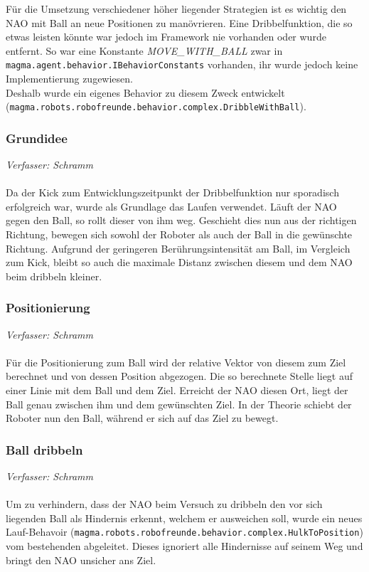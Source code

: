 Für die Umsetzung verschiedener höher liegender Strategien ist es wichtig den NAO mit Ball an neue Positionen zu manövrieren. Eine Dribbelfunktion, die so etwas leisten könnte war jedoch im Framework nie vorhanden oder wurde entfernt. So war eine Konstante \textit{MOVE\_WITH\_BALL} zwar in \texttt{magma.agent.behavior.IBehaviorConstants} vorhanden, ihr wurde jedoch keine Implementierung zugewiesen.\\
Deshalb wurde ein eigenes Behavior zu diesem Zweck entwickelt\\
(\texttt{magma.robots.robofreunde.behavior.complex.DribbleWithBall}).

\subsubsection{Grundidee}
\textit{Verfasser: Schramm}\\
\\
Da der Kick zum Entwicklungszeitpunkt der Dribbelfunktion nur sporadisch erfolgreich war, wurde als Grundlage das Laufen verwendet. Läuft der NAO gegen den Ball, so rollt dieser von ihm weg. Geschieht dies nun aus der richtigen Richtung, bewegen sich sowohl der Roboter als auch der Ball in die gewünschte Richtung. Aufgrund der geringeren Berührungsintensität am Ball, im Vergleich zum Kick, bleibt so auch die maximale Distanz zwischen diesem und dem NAO beim dribbeln kleiner.

\subsubsection{Positionierung}
\textit{Verfasser: Schramm}\\
\\
Für die Positionierung zum Ball wird der relative Vektor von diesem zum Ziel berechnet und von dessen Position abgezogen. Die so berechnete Stelle liegt auf einer Linie mit dem Ball und dem Ziel. Erreicht der NAO diesen Ort, liegt der Ball genau zwischen ihm und dem gewünschten Ziel. In der Theorie schiebt der Roboter nun den Ball, während er sich auf das Ziel zu bewegt.

\subsubsection{Ball dribbeln}
\textit{Verfasser: Schramm}\\
\\
Um zu verhindern, dass der NAO beim Versuch zu dribbeln den vor sich liegenden Ball als Hindernis erkennt, welchem er ausweichen soll, wurde ein neues Lauf-Behavoir (\texttt{magma.robots.robofreunde.behavior.complex.HulkToPosition}) vom bestehenden abgeleitet. Dieses ignoriert alle Hindernisse auf seinem Weg und bringt den NAO unsicher ans Ziel.

